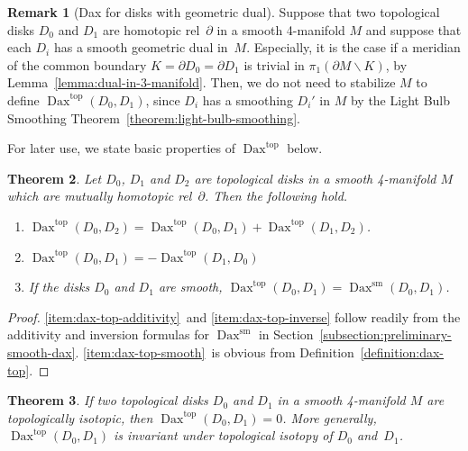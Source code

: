 \documentclass[11pt]{amsart}
\newtheorem{theorem}{Theorem}[section]
\theoremstyle{definition}
\newtheorem{remark}[theorem]{Remark}
\theoremstyle{theorem-giventitle}
\theoremstyle{definition-giventitle}
\numberwithin{equation}{section}
\def\sm{\mathrm{sm}}
\def\top{\mathrm{top}}
\def\Dax{\operatorname{Dax}}
\def\setminus{\smallsetminus}
\begin{document}
\begin{remark}[Dax for disks with geometric dual]
  Suppose that two topological disks $D_0$ and $D_1$ are homotopic rel~$\partial$ in a smooth 4-manifold $M$ and suppose that each $D_i$ has a smooth geometric dual in~$M$.
  Especially, it is the case if a meridian of the common boundary $K=\partial D_0=\partial D_1$ is trivial in $\pi_1(\partial M\setminus K)$, by Lemma~\ref{lemma:dual-in-3-manifold}.
  Then, we do not need to stabilize $M$ to define $\Dax^\top(D_0,D_1)$, since $D_i$ has a smoothing $D_i'$ in $M$ by the Light Bulb Smoothing Theorem~\ref{theorem:light-bulb-smoothing}\@.
\end{remark}

For later use, we state basic properties of $\Dax^\top$ below.

\begin{theorem}
  \label{theorem:dax-top-properties}
  Let $D_0$, $D_1$ and $D_2$ are topological disks in a smooth 4-manifold $M$ which are mutually homotopic rel~$\partial$.
  Then the following hold.
  \begin{enumerate}
    \item\label{item:dax-top-additivity} $\Dax^\top(D_0,D_2) = \Dax^\top(D_0,D_1) + \Dax^\top(D_1,D_2)$.
    \item\label{item:dax-top-inverse} $\Dax^\top(D_0,D_1) = -\Dax^\top(D_1,D_0)$
    \item\label{item:dax-top-smooth} If the disks $D_0$ and $D_1$ are smooth, $\Dax^\top(D_0,D_1) = \Dax^\sm(D_0,D_1)$.
  \end{enumerate}
\end{theorem}

\begin{proof}
  \ref{item:dax-top-additivity}~and \ref{item:dax-top-inverse} follow readily from the additivity and inversion formulas for $\Dax^\sm$ in Section~\ref{subsection:preliminary-smooth-dax}.
  \ref{item:dax-top-smooth}~is obvious from Definition~\ref{definition:dax-top}.
\end{proof}

\begin{theorem}
  \label{theorem:dax-top-isotopy}
  If two topological disks $D_0$ and $D_1$ in a smooth 4-manifold $M$ are topologically isotopic, then $\Dax^\top(D_0,D_1)=0$.
  More generally, $\Dax^\top(D_0,D_1)$ is invariant under topological isotopy of $D_0$ and~$D_1$.
\end{theorem}
\end{document}
